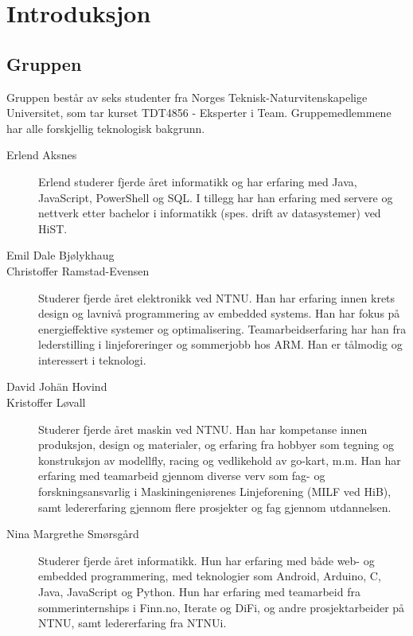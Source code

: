 \chapter{Introduksjon}
\section{Gruppen}
Gruppen består av seks studenter fra Norges Teknisk-Naturvitenskapelige
Universitet, som tar kurset TDT4856 - Eksperter i Team. Gruppemedlemmene
har alle forskjellig teknologisk bakgrunn.
\begin{description} %
	\item[Erlend Aksnes] Erlend studerer fjerde året informatikk og har erfaring med Java, JavaScript, PowerShell og SQL. I tillegg har han erfaring med servere og nettverk etter bachelor i informatikk (spes. drift av datasystemer) ved HiST. 
	\item[Emil Dale Bjølykhaug] %
	\item[Christoffer Ramstad-Evensen] \comment{\hfill \\} Studerer fjerde
  året elektronikk ved NTNU. Han har erfaring innen krets design
  og lavnivå programmering av embedded systems. Han har fokus på energieffektive
  systemer og optimalisering. Teamarbeidserfaring har han fra lederstilling i
  linjeforeringer og sommerjobb hos ARM. Han er tålmodig og interessert i
  teknologi.
	\item[David Johän Hovind] %
	\item[Kristoffer Løvall] \comment{\hfill \\} Studerer fjerde året maskin ved NTNU. 
	Han har kompetanse innen produksjon, design og materialer, og erfaring
	fra hobbyer som tegning og konstruksjon av modellfly, racing og vedlikehold
	av go-kart, m.m. Han har erfaring med teamarbeid gjennom diverse verv som fag-
	og forskningsansvarlig i Maskiningeniørenes Linjeforening (MILF ved HiB), samt
	ledererfaring gjennom flere prosjekter og fag gjennom utdannelsen.
	
	\item[Nina Margrethe Smørsgård] \comment{\hfill \\}Studerer fjerde året
	informatikk. Hun har erfaring med både web- og embedded programmering, med
	teknologier som Android, Arduino, C, Java, JavaScript og Python. Hun har
	erfaring med teamarbeid fra sommerinternships i Finn.no, Iterate og DiFi,
	og andre prosjektarbeider på NTNU, samt ledererfaring fra NTNUi.
\end{description}

